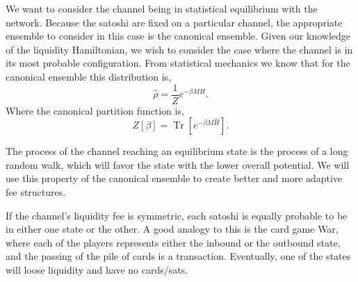 \documentclass[review,12pt]{elsarticle}
\DeclareMathOperator{\Tr}{\mathrm{Tr}}
\begin{document}

We want to consider the channel being in statistical equilibrium with the network.
Because the satoshi are fixed on a particular channel, the appropriate ensemble to consider in this case is the canonical ensemble.
Given our knowledge of the liquidity Hamiltonian, we wish to consider the case where the channel is in its most probable configuration.
From statistical mechanics we know that for the canonical ensemble this distribution is,
\begin{equation}
  \hat{\rho} = \frac{1}{Z}e^{-\beta M \hat{H}}. \nonumber
\end{equation}
Where the canonical partition function is,
\begin{equation}
  Z[\beta] = \Tr\left[e^{-\beta M \hat{H}}\right]. \nonumber
\end{equation}

The process of the channel reaching an equilibrium state is the process of a long random walk, which will favor the state with the lower overall potential.
We will use this property of the canonical ensemble to create better and more adaptive fee structures.

If the channel's liquidity fee is symmetric, each satoshi is equally probable to be in either one state or the other.
A good analogy to this is the card game War, where each of the players represents either the inbound or the outbound state, and the passing of the pile of cards is a transaction.
Eventually, one of the states will loose liquidity and have no cards/sats.
\end{document}
